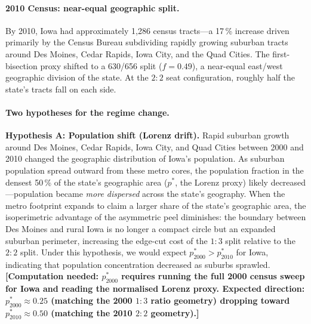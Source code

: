 \paragraph{2010 Census: near-equal geographic split.}
By 2010, Iowa had approximately 1{,}286 census tracts---a 17\,\% increase
driven primarily by the Census Bureau subdividing rapidly growing suburban
tracts around Des Moines, Cedar Rapids, Iowa City, and the Quad Cities.
The first-bisection proxy shifted to a 630/656 split ($f = 0.49$),
a near-equal east/west geographic division of the state.
At the $2:2$ seat configuration, roughly half the state's tracts fall on
each side.

\paragraph{Two hypotheses for the regime change.}

\textbf{Hypothesis A: Population shift (Lorenz drift).}
Rapid suburban growth around Des Moines, Cedar Rapids, Iowa City, and Quad
Cities between 2000 and 2010 changed the geographic distribution of Iowa's
population.
As suburban population spread outward from these metro cores, the population
fraction in the densest 50\,\% of the state's geographic area
($p^*$, the Lorenz proxy) likely decreased---population became \emph{more
dispersed} across the state's geography.
When the metro footprint expands to claim a larger share of the state's
geographic area, the isoperimetric advantage of the asymmetric peel diminishes:
the boundary between Des Moines and rural Iowa is no longer a compact circle
but an expanded suburban perimeter, increasing the edge-cut cost of the $1:3$
split relative to the $2:2$ split.
Under this hypothesis, we would expect $p^*_{2000} > p^*_{2010}$ for Iowa,
indicating that population concentration decreased as suburbs sprawled.
\textbf{[Computation needed: $p^*_{2000}$ requires running the full 2000
census sweep for Iowa and reading the normalised Lorenz proxy.
Expected direction: $p^*_{2000} \approx 0.25$ (matching the 2000 $1:3$ ratio
geometry) dropping toward $p^*_{2010} \approx 0.50$ (matching the 2010 $2:2$
geometry).]}

